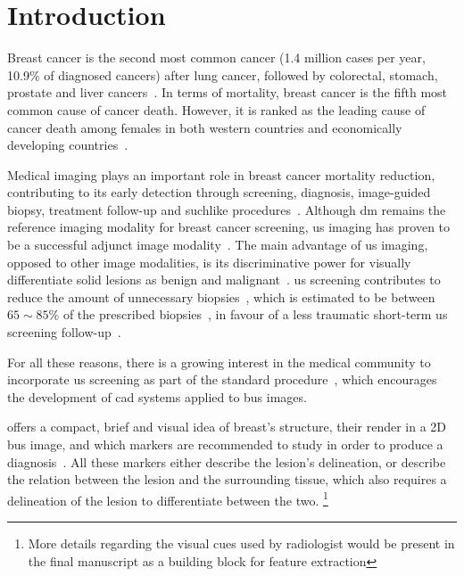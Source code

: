 \graphicspath{ {./content/intro/figures/} }

\section{Introduction}
\label{sec:intro}  %


Breast cancer is the second most common cancer (1.4 million cases per year, 10.9\% of  diagnosed cancers) after lung cancer, followed by colorectal, stomach, prostate and liver cancers~\cite{Ferlay2010}.
In terms of mortality, breast cancer is the fifth most common cause of cancer death.
However, it is ranked as the leading cause of cancer death among females in both western countries and economically developing countries~\cite{cancerStatistics2011}.

Medical imaging plays an important role in breast cancer mortality reduction, contributing to its early detection through screening, diagnosis, image-guided biopsy, treatment follow-up and suchlike procedures~\cite{smith2003american}.
Although \ac{dm} remains the reference imaging modality for breast cancer screening, \ac{us} imaging has proven to be a successful adjunct image modality~\cite{smith2003american,berg2004diagnostic}.
The main advantage of \ac{us} imaging, opposed to other image modalities, is its discriminative power for visually differentiate solid lesions as benign and malignant~\cite{Stavros:1995p12392}.
\Ac{us} screening contributes to reduce the amount of unnecessary biopsies~\cite{ciatto1994contribution}, which is estimated to be between $65\sim85\%$ of the prescribed biopsies~\cite{yuan2010multimodality}, in favour of a less traumatic short-term \ac{us} screening follow-up~\cite{gordon1995malignant}.

 For all these reasons, there is a growing interest in the medical community to incorporate \ac{us} screening as part of the standard procedure~\cite{biradsus}, which encourages the development of \ac{cad} systems applied to \ac{bus} images.

 offers a compact, brief and visual idea of breast's structure, their render in a 2D \ac{bus} image, and which markers are recommended to study in order to produce a diagnosis~\cite{biradsus}.
All these markers either describe the lesion's delineation, or describe the relation between the lesion and the surrounding tissue, which also requires a delineation of the lesion to differentiate between the two.
\footnote{More details regarding the visual cues used by radiologist would be present in the final manuscript as a building block for feature extraction}


